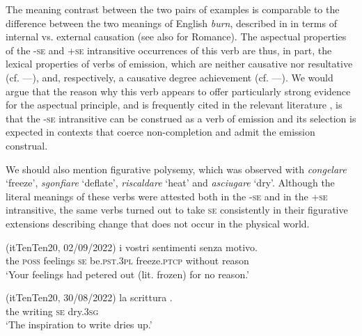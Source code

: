 \documentclass[output=paper,colorlinks,citecolor=brown
]{langscibook}
\begin{document}
The meaning contrast between the two pairs of examples is comparable to the difference between the two meanings of English \textit{burn}, described in \citet[101]{levin1995unaccusativity} in terms of internal vs. external causation (see also \cite{bentley2023internally} for Romance). The aspectual properties of the -\textsc{se} and +\textsc{se} intransitive occurrences of this verb are thus, in part, the lexical properties of verbs of emission, which are neither causative nor resultative (cf. —), and, respectively, a causative degree achievement (cf. —). We would argue that the reason why this verb appears to offer particularly strong evidence for the aspectual principle, and is frequently cited in the relevant literature \citep{jezek2003classi,folli2005consuming,cennamo2011anticausative,cennamo2012aspectual}, is that the -\textsc{se} intransitive can be construed as a verb of emission and its selection is expected in contexts that coerce non-completion and admit the emission construal.

We should also mention figurative polysemy, which was observed with \textit{congelare} ‘freeze’, \textit{sgonfiare} ‘deflate’, \textit{riscaldare} ‘heat’ and \textit{asciugare} ‘dry’. Although the literal meanings of these verbs were attested both in the -\textsc{se} and in the +\textsc{se} intransitive, the same verbs turned out to take \textsc{se} consistently in their figurative extensions describing change that does not occur in the physical world.

\hspace*{\fill}(itTenTen20, 02/09/2022)\quad
\ea \label{bentley_example_39}
    \gll  {\ldots}  i			vostri		sentimenti				 								senza			motivo.  \\
    	{} 	the	\textsc{poss}			feelings			\textsc{se}		be.\textsc{pst}.3\textsc{pl}		freeze.\textsc{ptcp}		without	reason \\
    \glt 	‘Your feelings had petered out (lit. frozen) for no reason.’	
\z

\hspace*{\fill}(itTenTen20, 30/08/2022)\quad
\ea \label{bentley_example_40}
    \gll  {\ldots}  la		scrittura				.  \\
    	{} the	writing		\textsc{se}		dry.3\textsc{sg} \\
    \glt ‘The inspiration to write dries up.’
\z
\end{document}
